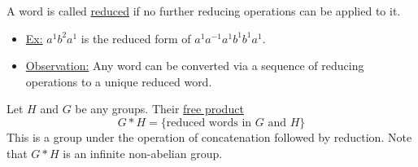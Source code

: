 \documentclass[../notes.tex]{subfiles}
\begin{document}
        \begin{definition}
            A word is called \underline{reduced} if no further reducing operations
            can be applied to it.
        \end{definition}
        \begin{itemize}
            \item \underline{Ex:} $a^1b^2a^1$ is the reduced form of $a^1a^{-1}a^1b^1b^1a^1$.
            \item \underline{Observation:} Any word can be converted via a 
                sequence of reducing operations to a unique reduced word.\\
        \end{itemize}
        \begin{definition}
            Let $H$ and $G$ be any groups. Their \underline{free product}
            \[
                G*H=\{\text{reduced words in $G$ and $H$}\}
            \]
            This is a group under the operation of concatenation followed
            by reduction.
            Note that $G*H$ is an infinite non-abelian group.
        \end{definition}
\end{document}
